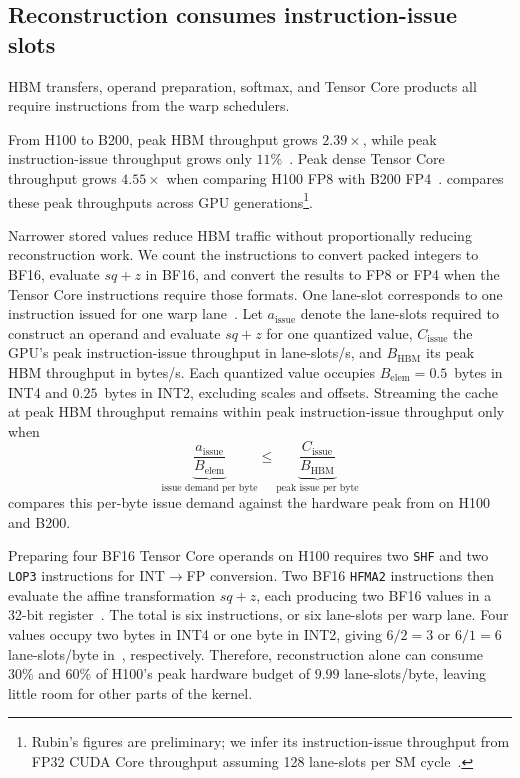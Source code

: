 \subsection{Reconstruction consumes instruction-issue slots}
\label{sec:analysis-issuerate}

HBM transfers, operand preparation, softmax, and Tensor Core products all require instructions from the warp schedulers.



From H100 to B200, peak HBM throughput grows $2.39\times$, while peak instruction-issue throughput grows only $11\%$~\cite{nvidia2025h100spec,nvidia2025dgxb200,nvidia2025hgxb200,nvidia2026cudabpg}.
Peak dense Tensor Core throughput grows $4.55\times$ when comparing H100 FP8 with B200 FP4~\cite{nvidia2025h100spec,nvidia2025dgxb200,nvidia2025hgxb200}.
 compares these peak throughputs across GPU generations\footnote{Rubin's figures are preliminary; we infer its instruction-issue throughput from FP32 CUDA Core throughput assuming 128 lane-slots per SM cycle~\cite{nvidia2023gpuperformance,nvidia2026rubin,nvidia2026cudabpg}.}.

Narrower stored values reduce HBM traffic without proportionally reducing reconstruction work.
We count the instructions to convert packed integers to BF16, evaluate $sq+z$ in BF16, and convert the results to FP8 or FP4 when the Tensor Core instructions require those formats.
One lane-slot corresponds to one instruction issued for one warp lane~\cite{nvidia2026cudaguide}.
Let $a_{\mathrm{issue}}$ denote the lane-slots required to construct an operand and evaluate $sq+z$ for one quantized value, $C_{\mathrm{issue}}$ the GPU's peak instruction-issue throughput in lane-slots/s, and $B_{\mathrm{HBM}}$ its peak HBM throughput in bytes/s.
Each quantized value occupies $B_{\mathrm{elem}}=0.5$~bytes in INT4 and $0.25$~bytes in INT2, excluding scales and offsets.
Streaming the cache at peak HBM throughput remains within peak instruction-issue throughput only when
\begin{equation}
  \underbrace{\frac{a_{\mathrm{issue}}}{B_{\mathrm{elem}}}}_{\text{issue demand per byte}}
  \leq
  \underbrace{\frac{C_{\mathrm{issue}}}{B_{\mathrm{HBM}}}}_{\text{peak issue per byte}}
  \label{eq:issue-balance}
\end{equation}
 compares this per-byte issue demand against the hardware peak from  on H100 and B200.

Preparing four BF16 Tensor Core operands on H100 requires two \texttt{SHF} and two \texttt{LOP3} instructions for INT$\to$FP conversion.
Two BF16 \texttt{HFMA2} instructions then evaluate the affine transformation $sq+z$, each producing two BF16 values in a 32-bit register~\cite{frantar2025marlin}.
The total is six instructions, or six lane-slots per warp lane.
Four values occupy two bytes in INT4 or one byte in INT2, giving $6/2=3$ or $6/1=6$ lane-slots/byte in~, respectively.
Therefore, reconstruction alone can consume $30\%$ and $60\%$ of H100's peak hardware budget of $9.99$ lane-slots/byte, leaving little room for other parts of the kernel.

